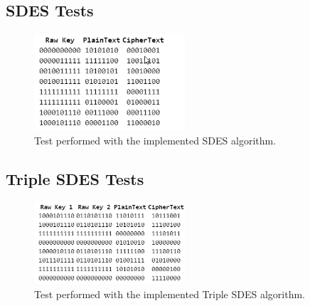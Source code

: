 \documentclass[letterpaper,12pt]{article}
\begin{document}
\subsection{SDES Tests}
\begin{figure}[H]
    \centering
    \includegraphics[width=0.5\textwidth]{assets/SDES_Test.png}
    \caption{Test performed with the implemented SDES algorithm.}
\end{figure}

\subsection{Triple SDES Tests}
\begin{figure}[H]
    \centering
    \includegraphics[width=0.5\textwidth]{assets/3SDES_Test.png}
    \caption{Test performed with the implemented Triple SDES algorithm.}
\end{figure}
\end{document}
